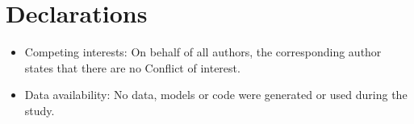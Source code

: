 \documentclass[pdflatex,sn-mathphys-num]{sn-jnl}%
\theoremstyle{thmstyleone}%
\theoremstyle{thmstyletwo}%
\theoremstyle{thmstylethree}%
\theoremstyle{thmstyletwo}
\begin{document}
\section*{Declarations}
\begin{itemize}
\item Competing interests: On behalf of all authors, the corresponding author states that there are no Conflict of interest.
\item Data availability: No data, models or code were generated or used during the study.
\end{itemize}


%
%
%
%
\end{document}
